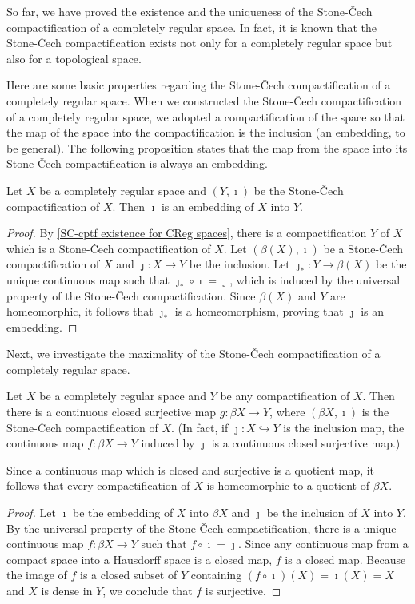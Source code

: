 So far, we have proved the existence and the uniqueness of the Stone-\v{C}ech compactification of a completely regular space.
In fact, it is known that the Stone-\v{C}ech compactification exists not only for a completely regular space but also for a topological space.

Here are some basic properties regarding the Stone-\v{C}ech compactification of a completely regular space.
When we constructed the Stone-\v{C}ech compactification of a completely regular space, we adopted a compactification of the space so that the map of the space into the compactification is the inclusion (an embedding, to be general).
The following proposition states that the map from the space into its Stone-\v{C}ech compactification is always an embedding.
\begin{prop}
    Let $X$ be a completely regular space and $(Y, \imath)$ be the Stone-\v{C}ech compactification of $X$.
    Then $\imath$ is an embedding of $X$ into $Y$.
\end{prop}
\begin{proof}
    By \cref{SC-cptf existence for CReg spaces}, there is a compactification $Y$ of $X$ which is a Stone-\v{C}ech compactification of $X$.
    Let $(\beta(X), \imath)$ be a Stone-\v{C}ech compactification of $X$ and $\jmath: X\rightarrow Y$ be the inclusion.
    Let $\jmath_*: Y\rightarrow \beta(X)$ be the unique continuous map such that $\jmath_*\circ\imath=\jmath$, which is induced by the universal property of the Stone-\v{C}ech compactification.
    Since $\beta(X)$ and $Y$ are homeomorphic, it follows that $\jmath_*$ is a homeomorphism, proving that $\jmath$ is an embedding.
\end{proof}
Next, we investigate the maximality of the Stone-\v{C}ech compactification of a completely regular space.
\begin{prop}
    Let $X$ be a completely regular space and $Y$ be any compactification of $X$.
    Then there is a continuous closed surjective map $g: \beta X\rightarrow Y$, where $(\beta X, \imath)$ is the Stone-\v{C}ech compactification of $X$.
    (In fact, if $\jmath: X\hookrightarrow Y$ is the inclusion map, the continuous map $f: \beta X\rightarrow Y$ induced by $\jmath$ is a continuous closed surjective map.)
\end{prop}
\begin{rmk}
    Since a continuous map which is closed and surjective is a quotient map, it follows that every compactification of $X$ is homeomorphic to a quotient of $\beta X$.
\end{rmk}
\begin{proof}
    Let $\imath$ be the embedding of $X$ into $\beta X$ and $\jmath$ be the inclusion of $X$ into $Y$.
    By the universal property of the Stone-\v{C}ech compactification, there is a unique continuous map $f: \beta X\rightarrow Y$ such that $f\circ\imath=\jmath$.
    Since any continuous map from a compact space into a Hausdorff space is a closed map, $f$ is a closed map.
    Because the image of $f$ is a closed subset of $Y$ containing $(f\circ\imath)(X)=\imath(X)=X$ and $X$ is dense in $Y$, we conclude that $f$ is surjective.
\end{proof}

